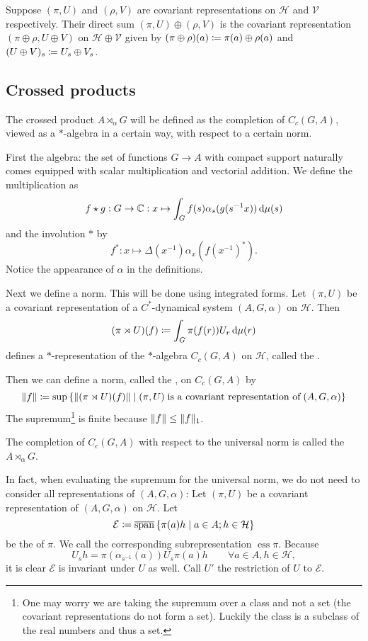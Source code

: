Suppose $(\pi,U)$ and $(\rho, V)$ are covariant representations on $\mathcal{H}$ and $\mathcal{V}$ respectively. Their direct sum $(\pi, U) \oplus (\rho, V )$ is the covariant representation $(\pi \oplus \rho, U \oplus V )$ on $\mathcal{H} \oplus \mathcal{V}$ given by $(\pi \oplus \rho)(a) \coloneqq \pi(a)\oplus \rho(a)$ and $(U \oplus V)_s \coloneqq U_s \oplus V_s$.
\subsection{Crossed products}
The crossed product $A \rtimes_\alpha G$ will be defined as the completion of $C_c(G,A)$, viewed as a $*$-algebra in a certain way, with respect to a certain norm.

First the algebra: the set of functions $G\to A$ with compact support naturally comes equipped with scalar multiplication and vectorial addition. We define the multiplication as
\[ f\star g: G \to \mathbb{C}: x\mapsto \int_G f(s)\alpha_s(g(s^{-1}x))\operatorname{d \!}\mu(s) \]
and the involution $*$ by
\[ f^*: x\mapsto \Delta(x^{-1})\alpha_x(f(x^{-1})^*). \]
Notice the appearance of $\alpha$ in the definitions.

Next we define a norm. This will be done using integrated forms.
Let $(\pi, U)$ be a covariant representation of a $C^*$-dynamical system $(A,G,\alpha)$ on $\mathcal{H}$. Then
\[ (\pi \rtimes U) (f)  \coloneqq \int_G\pi(f(r))U_r \operatorname{d \!}\mu(r)\]
defines a $*$-representation of the $*$-algebra $C_c(G,A)$ on $\mathcal{H}$, called the .

Then we can define a norm, called the , on $C_c(G,A)$ by
\[ \lVert f\rVert \coloneqq \sup\left\{ \lVert(\pi\rtimes U)(f)\rVert \;\middle|\; (\pi, U)\;\text{is a covariant representation of} \; (A,G,\alpha) \right\} \]
The supremum\footnote{One may worry we are taking the supremum over a class and not a set (the covariant representations do not form a set). Luckily the class is a subclass of the real numbers and thus a set.} is finite because $\lVert f\rVert \leq \lVert f\rVert_1$.

The completion of $C_c(G,A)$ with respect to the universal norm is called the  $A \rtimes_\alpha G$.

In fact, when evaluating the supremum for the universal norm, we do not need to consider all representations of $(A,G,\alpha)$: Let $(\pi, U)$ be a covariant representation of $(A,G,\alpha)$ on $\mathcal{H}$. Let 
\[ \mathcal{E} \coloneqq \overline{\operatorname{span}}\left\{ \pi(a)h \;\middle|\; a\in A; h\in \mathcal{H} \right\} \]
be the  of $\pi$. We call the corresponding subrepresentation $\operatorname{ess} \pi$. Because
\[ U_s h =  \pi(\alpha_{s^{-1}}(a))U_s\pi(a) h \qquad \forall a\in A, h\in\mathcal{H}, \]
it is clear $\mathcal{E}$ is invariant under $U$ as well. Call $U'$ the restriction of $U$ to $\mathcal{E}$.

